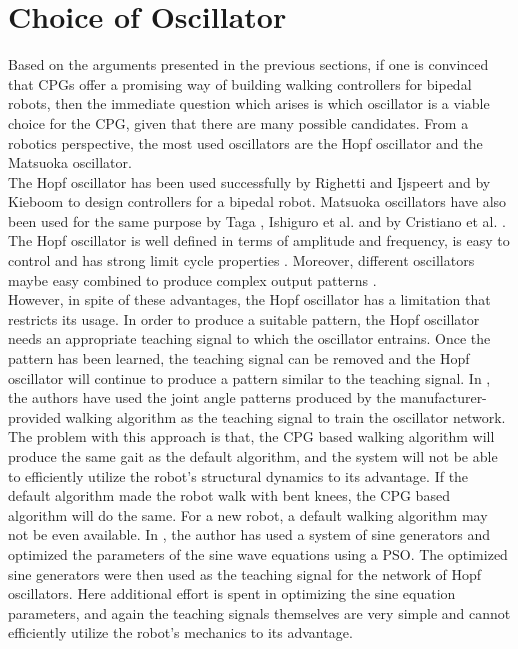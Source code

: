 \documentclass[12pt,twoside]{article}
\theoremstyle{plain}
\theoremstyle{definition}
\theoremstyle{remark}
\newcommand{\forceindent}{\leavevmode{\parindent=2em\indent}}
\begin{document}
\section{Choice of Oscillator}
\label{sec:Choice_of_Oscillator}
\forceindent Based on the arguments presented in the previous sections, if one is convinced that CPGs offer a promising way of building walking controllers for bipedal robots, then the immediate question which arises is which oscillator is a viable choice for the CPG, given that there are many possible candidates. From a robotics perspective, the most used oscillators are the Hopf oscillator and the Matsuoka oscillator. \\
\forceindent The Hopf oscillator has been used successfully by Righetti and Ijspeert \cite{Righetti2006} and by Kieboom \cite{Kieboom2009} to design controllers for a bipedal robot. Matsuoka oscillators have also been used for the same purpose by Taga \cite{Taga1991}, Ishiguro et al. \cite{Ishiguro2003} and by Cristiano et al. \cite{cristiano2014locomotion}. The Hopf oscillator is well defined in terms of amplitude and frequency, is easy to control and has strong limit cycle properties \cite{Kieboom2009}. Moreover, different oscillators maybe easy combined to produce complex output patterns \cite{Righetti2006}. \\
\forceindent However, in spite of these advantages, the Hopf oscillator has a limitation that restricts its usage. In order to produce a suitable pattern, the Hopf oscillator needs an appropriate teaching signal to which the oscillator entrains. Once the pattern has been learned, the teaching signal can be removed and the Hopf oscillator will continue to produce a pattern similar to the teaching signal. In \cite{Righetti2006}, the authors have used the joint angle patterns produced by the manufacturer-provided walking algorithm as the teaching signal to train the oscillator network. The problem with this approach is that, the CPG based walking algorithm will produce the same gait as the default algorithm, and the system will not be able to efficiently utilize the robot's structural dynamics to its advantage. If the default algorithm made the robot walk with bent knees, the CPG based algorithm will do the same. For a new robot, a default walking algorithm may not be even available. In \cite{Kieboom2009}, the author has used a system of sine generators and optimized the parameters of the sine wave equations using a PSO. The optimized sine generators were then used as the teaching signal for the network of Hopf oscillators. Here additional effort is spent in optimizing the sine equation parameters, and again the teaching signals themselves are very simple and cannot efficiently utilize the robot's mechanics to its advantage.\\
\end{document}
